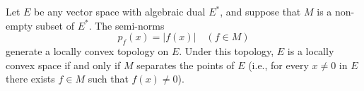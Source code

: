 Let $E$ be any vector space with algebraic dual $E^*$, and suppose that $M$ is a non-empty subset of $E^*$. The semi-norms
$$
p_f(x) = |f(x)| \quad (f \in M)
$$
generate a locally convex topology on $E$. Under this topology, $E$ is a locally convex space if and only if $M$ separates the points of $E$ (i.e., for every $x \neq 0$ in $E$ there exists $f \in M$ such that $f(x) \neq 0$).
